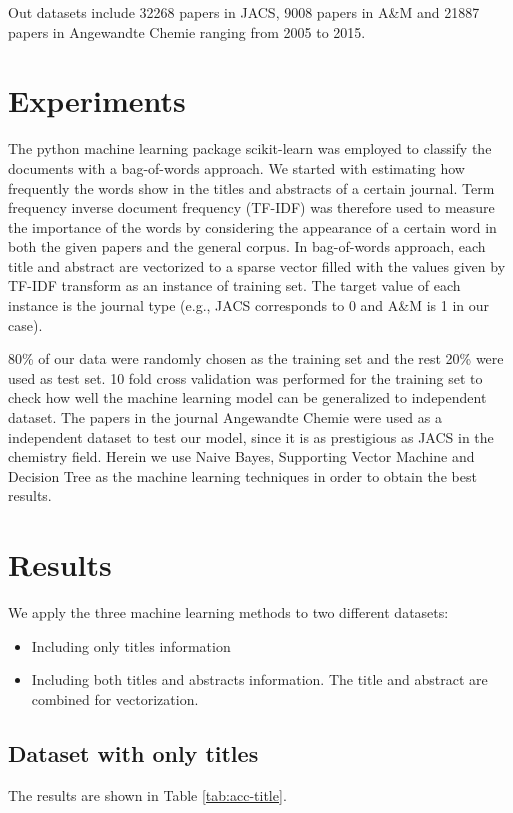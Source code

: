 \documentclass[conference]{IEEEtran}
\begin{document}
Out datasets include 32268 papers in JACS, 9008 papers in A\&M and 21887 papers in Angewandte Chemie ranging from 2005 to 2015.

\section{Experiments}

The python machine learning package scikit-learn was employed to classify the documents with a bag-of-words approach. We started with estimating how frequently the words show in the titles and abstracts of a certain journal. Term frequency inverse document frequency (TF-IDF) was therefore used to measure the importance of the words by considering the appearance of a certain word in both the given papers and the general corpus. In bag-of-words approach, each title and abstract are vectorized to a sparse vector filled with the values given by TF-IDF transform as an instance of training set. The target value of each instance is the journal type (e.g., JACS corresponds to 0 and A\&M is 1 in our case).

80\% of our data were randomly chosen as the training set and the rest 20\% were used as test set. 10 fold cross validation was performed for the training set to check how well the machine learning model can be generalized to independent dataset. The papers in the journal Angewandte Chemie were used as a independent dataset to test our model, since it is as prestigious as JACS in the chemistry field. Herein we use Naive Bayes, Supporting Vector Machine and Decision Tree as the machine learning techniques in order to obtain the best results.

\section{Results}
We apply the three machine learning methods to two different datasets:

\begin{itemize}
    \item{Including only titles information}
    \item{Including both titles and abstracts information. The title and abstract are combined for vectorization.}
\end{itemize}

\subsection{Dataset with only titles}
The results are shown in Table \ref{tab:acc-title}.
\end{document}
